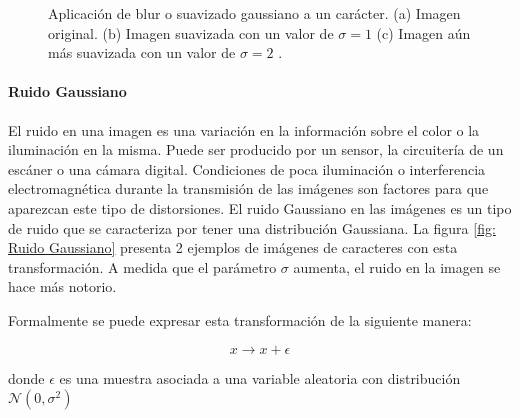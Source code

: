 		\begin{figure}[htbp]
			\centering
			\caption[Suavizado Gaussiano de un carácter]{Aplicación de blur o suavizado gaussiano a un carácter. (a) Imagen original. (b) Imagen suavizada con un valor de $\sigma = 1$  (c) Imagen aún más suavizada con un valor de $\sigma = 2$ .}
			\label{fig: Suavizado Gaussiano}
		\end{figure}				
			
			
		\paragraph{Ruido Gaussiano}			
			
			El ruido en una imagen es una variación en la información sobre el color o la iluminación en la misma. Puede ser producido por un sensor, la circuitería de un escáner o una cámara digital. Condiciones de poca iluminación o interferencia electromagnética durante la transmisión de las imágenes son factores para que aparezcan este tipo de distorsiones. El ruido Gaussiano en las imágenes es un tipo de ruido que se caracteriza por tener una distribución Gaussiana. La figura \ref{fig: Ruido Gaussiano} presenta 2 ejemplos de imágenes de caracteres con esta transformación. A medida que el parámetro $\sigma$  aumenta, el ruido en la imagen se hace más notorio.
			
			Formalmente se puede expresar esta transformación de la siguiente manera:
			
			$$x \rightarrow x + \epsilon $$
			
			donde $\epsilon$ es una muestra asociada a una variable aleatoria con distribución $\mathcal{N}(0, \sigma^2)$
			
